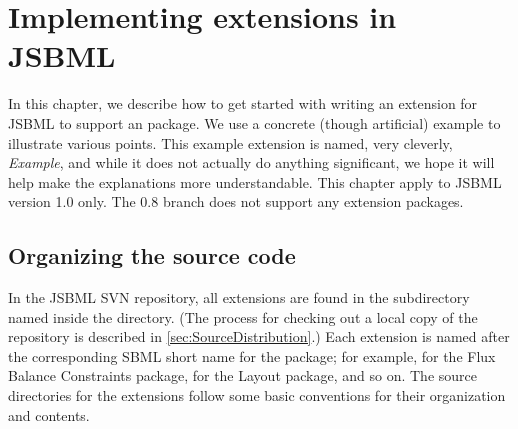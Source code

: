 
\chapter{Implementing extensions in JSBML}
\label{sec:howToExtension}

In this chapter, we describe how to get started with writing an extension
for JSBML to support an \SBMLthree package.  We use a concrete (though
artificial) example to illustrate various points.  This example extension
is named, very cleverly, \emph{Example}, and while it does not actually do
anything significant, we hope it will help make the explanations more
understandable. This chapter apply to JSBML version 1.0 only.
The 0.8 branch does not support any extension packages.


\section{Organizing the source code}
\label{sec:example-organization}

In the JSBML SVN repository, all extensions are found in the subdirectory
named  inside the  directory.  (The process
for checking out a local copy of the repository is described
in \vref{sec:SourceDistribution}.) Each extension is named after the
corresponding SBML short name for the \SBMLthree package; for example,
 for the Flux Balance Constraints package,  for the
Layout package, and so on.  The source directories for the extensions
follow some basic conventions for their organization and contents.

